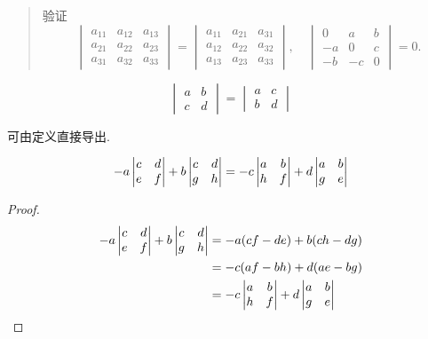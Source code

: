 \begin{quotation}
验证
\[
\begin{vmatrix}
    a_{11} & a_{12} & a_{13} \\
    a_{21} & a_{22} & a_{23} \\
    a_{31} & a_{32} & a_{33}
\end{vmatrix}
=
\begin{vmatrix}
    a_{11} & a_{21} & a_{31} \\
    a_{12} & a_{22} & a_{32} \\
    a_{13} & a_{23} & a_{33}
\end{vmatrix}
, \quad
\begin{vmatrix}
    0 & a & b \\
    -a & 0 & c \\
    -b & -c & 0
\end{vmatrix}
= 0.
\]
\end{quotation}

\begin{lemma}\label{lem:ch01:sec04:lem1}
    \[
        \begin{vmatrix}
            a & b \\ c & d
        \end{vmatrix}
        =
        \begin{vmatrix}
            a & c \\ b & d
        \end{vmatrix}
    \]
\end{lemma}
 可由定义直接导出.

\begin{lemma}\label{lem:ch01:sec04:2}
\[
    -a\begin{vmatrix} c & d \\ e & f \end{vmatrix}
    +b\begin{vmatrix} c & d \\ g & h \end{vmatrix}
    =
    -c\begin{vmatrix}a & b \\ h & f\end{vmatrix}
    +d\begin{vmatrix}a & b \\ g & e\end{vmatrix}
\]
\end{lemma}
\begin{proof}
\[
\begin{aligned}
    -a\begin{vmatrix}c & d \\ e & f\end{vmatrix} + b\begin{vmatrix}c & d \\ g & h\end{vmatrix}
    &= -a(cf - de) + b(ch - dg) \\
    &= -c(af - bh) + d(ae - bg) \\
    &= -c\begin{vmatrix}a & b \\ h & f\end{vmatrix}+d\begin{vmatrix}a & b \\ g & e\end{vmatrix}
\end{aligned}
\]
\end{proof}

